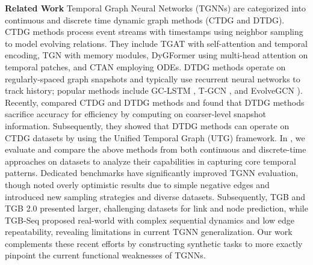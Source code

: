 
\textbf{Related Work}
Temporal Graph Neural Networks (TGNNs) are categorized into continuous and discrete time dynamic graph methods (CTDG and DTDG). CTDG methods process event streams with timestamps using neighbor sampling to model evolving relations. They include TGAT \citep{tgat} with self-attention and temporal encoding, TGN \citep{tgn} with memory modules, DyGFormer \citep{dygformer} using multi-head attention on temporal patches, and CTAN \citep{ctan} employing ODEs. DTDG methods operate on regularly-spaced graph snapshots and typically use recurrent neural networks to track history; popular methods include GC-LSTM \citep{gclstm}, T-GCN \citep{tgcn}, and EvolveGCN \citep{evolvegcn}). 
Recently, \cite{huangutg} compared CTDG and DTDG methods and found that DTDG methods sacrifice accuracy for efficiency by computing on coarser-level snapshot information. Subsequently, they showed that DTDG methods can operate on CTDG datasets by using the Unified Temporal Graph (UTG) framework. In , we evaluate and compare the above methods from both continuous and discrete-time approaches on \benchmarkname datasets to analyze their capabilities in capturing core temporal patterns. Dedicated benchmarks \citep{Jodie_Kumar_2019, uci, enron, social-evo} have significantly improved TGNN evaluation, though \cite{poursafaei2022betterevaluationdynamiclink} noted overly optimistic results due to simple negative edges and introduced new sampling strategies and diverse datasets. Subsequently, TGB \citep{tgb} and TGB 2.0 \citep{tgb2.0} presented larger, challenging datasets for link and node prediction, while TGB-Seq \citep{tgb-seq} proposed real-world  with complex sequential dynamics and low edge repeatability, revealing limitations in current TGNN generalization. Our work complements these recent efforts by constructing synthetic tasks to more exactly pinpoint the current functional weaknesses of TGNNs.





